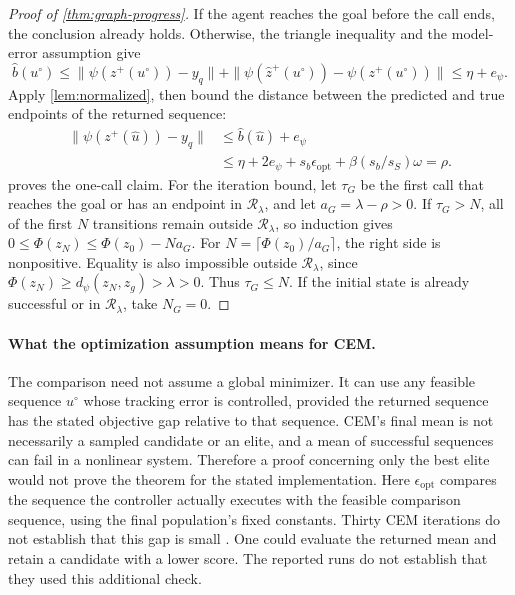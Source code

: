 \documentclass{article}
\newcommand{\dd}{d_{\psi}}
\newcommand{\Rset}{\mathcal R_\lambda}
\theoremstyle{definition}
\theoremstyle{remark}
\begin{document}
\begin{proof}[Proof of \cref{thm:graph-progress}]
If the agent reaches the goal before the call ends, the conclusion already holds.
Otherwise,
the triangle inequality and the model-error assumption give
\[
 \widehat b(u^\circ)\le
 \|\psi(z^+(u^\circ))-y_q\|
 +\|\psi(\hat z^+(u^\circ))-\psi(z^+(u^\circ))\|
 \le\eta+e_\psi .
\]
Apply \cref{lem:normalized}, then bound the distance between the predicted and true
endpoints of the returned sequence:
\begin{align*}
 \|\psi(z^+(\hat u))-y_q\|
 &\le\widehat b(\hat u)+e_\psi\\
 &\le\eta+2e_\psi+s_b\epsilon_{\mathrm{opt}}
                +\beta(s_b/s_S)\omega=\rho.
\end{align*}
 proves the one-call claim.
For the iteration bound, let $\tau_G$ be the first call that reaches the goal or has
an endpoint in $\Rset$, and let
$a_G=\lambda-\rho>0$. If $\tau_G>N$,
all of the first $N$ transitions remain outside $\Rset$, so induction gives
$0\le\Phi(z_N)\le\Phi(z_0)-Na_G$.
For $N=\lceil\Phi(z_0)/a_G\rceil$, the right side is nonpositive.
Equality is also impossible outside $\Rset$, since
$\Phi(z_N)\ge\dd(z_N,z_g)>\lambda>0$.
Thus $\tau_G\le N$. If the initial state is already successful or in $\Rset$, take $N_G=0$.
\end{proof}

\paragraph{What the optimization assumption means for CEM.}
The comparison need not assume a global minimizer.
It can use any feasible sequence $u^\circ$ whose tracking error is controlled,
provided the returned sequence has the stated objective gap relative to that sequence.
CEM's final mean is not necessarily a sampled candidate or an elite, and a mean of
successful sequences can fail in a nonlinear system. Therefore a proof concerning only
the best elite would not prove the theorem for the stated implementation.
Here $\epsilon_{\mathrm{opt}}$ compares the sequence the controller actually executes
with the feasible comparison sequence, using the final population's fixed constants.
Thirty CEM iterations do not establish that this gap is small
\citep{cem}. One could evaluate the returned mean and retain a candidate with a lower
score. The reported runs do not establish that they used this additional check.
\end{document}
